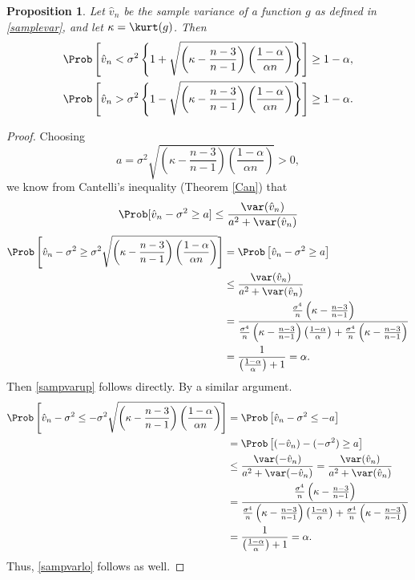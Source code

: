 \documentclass[12pt]{amsart}
\newcommand{\hv}{\hat{v}}
\newtheorem{prop}[theorem]{Proposition}
\begin{document}
\begin{prop}\label{propCant} Let $\hv_n$ be the sample variance of a function $g$ as defined in \eqref{samplevar}, and let $\kappa=\kurt(g)$.  Then
\begin{subequations} \label{sampvarbd}
\begin{gather}\label{sampvarup}
\Prob\left[\hv_n < \sigma^2 \left\{1 + \sqrt{\left ( \kappa  - \frac{n-3}{n-1}\right)\left(\frac{1-\alpha}{\alpha n}\right)}\right\} \right] \ge 1 - \alpha, \\
\label{sampvarlo}
\Prob\left[\hv_n > \sigma^2 \left\{1 - \sqrt{\left ( \kappa  - \frac{n-3}{n-1}\right)\left(\frac{1-\alpha}{\alpha n}\right)}\right\} \right] \ge 1 - \alpha.
\end{gather}
\end{subequations}
\end{prop}
\begin{proof}Choosing
$$a=\sigma^2\sqrt{\left(\kappa-\frac{n-3}{n-1}\right)\left(\frac{1-\alpha}{\alpha n}\right)} >0,
$$
we know from Cantelli's inequality (Theorem \ref{Can})  that
$$\Prob[\hv_n-\sigma^2 \geq
a]\leq\frac{\var(\hv_n)}{a^2+\var(\hv_n)}$$
\begin{align*}
\Prob\left[\hv_n-\sigma^2 \geq
\sigma^2\sqrt{\left(\kappa-\frac{n-3}{n-1}\right)\left(\frac{1-\alpha}{\alpha n}\right)} \right] & = \Prob\left[\hv_n-\sigma^2 \geq
a \right]\\
& \leq\frac{\var(\hv_n)}{a^2+\var(\hv_n)}\\
&= \frac{\frac{\sigma^4}{n}\left(\kappa - \frac{n-3}{n-1}\right)}{\frac{\sigma^4}{n}\left(\kappa - \frac{n-3}{n-1}\right)\left(\frac{1-\alpha}{\alpha}\right)+\frac{\sigma^4}{n}\left(\kappa - \frac{n-3}{n-1}\right)} \\
&=\frac{1}{\left(\frac{1-\alpha}{\alpha}\right)+1}=\alpha.
\end{align*}
Then \eqref{sampvarup} follows directly.  By a similar argument.
\begin{align*}
\Prob\left[\hv_n-\sigma^2 \le
- \sigma^2\sqrt{\left(\kappa-\frac{n-3}{n-1}\right)\left(\frac{1-\alpha}{\alpha n}\right)} \right] & = \Prob\left[\hv_n-\sigma^2 \le -a \right]\\
& = \Prob\left[(-\hv_n)-(-\sigma^2) \ge a \right]\\& \leq\frac{\var(-\hv_n)}{a^2+\var(-\hv_n)}= \frac{\var(\hv_n)}{a^2+\var(\hv_n)}\\
&= \frac{\frac{\sigma^4}{n}\left(\kappa - \frac{n-3}{n-1}\right)}{\frac{\sigma^4}{n}\left(\kappa - \frac{n-3}{n-1}\right)\left(\frac{1-\alpha}{\alpha}\right)+\frac{\sigma^4}{n}\left(\kappa - \frac{n-3}{n-1}\right)} \\
&=\frac{1}{\left(\frac{1-\alpha}{\alpha}\right)+1}=\alpha.
\end{align*}
Thus, \eqref{sampvarlo} follows as well.
\end{proof}



\end{document}
